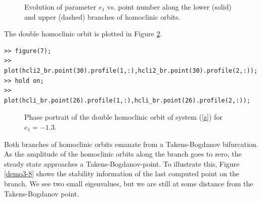 \documentclass[10pt]{article}
\begin{document}
{\begin{figure}[ht]
\begin{center}
\caption{\small\label{demo3-6}Evolution of parameter $e_1$ vs. point number
along the lower (solid) and upper (dashed) branches of homoclinic orbits.}
\end{center}
\end{figure}
 The double homoclinic orbit
is plotted in Figure \ref{demo3-7}.
{\small\begin{verbatim}
>> figure(7);
>> plot(hcli2_br.point(30).profile(1,:),hcli2_br.point(30).profile(2,:));
>> hold on;
>> plot(hcli_br.point(26).profile(1,:),hcli_br.point(26).profile(2,:));
\end{verbatim}}
\begin{figure}[ht]
\begin{center}
\caption{\small\label{demo3-7}Phase portrait of the double homoclinic orbit of system
(\ref{z}) for 
$e_{1}=-1.3$.}
\end{center}
\end{figure}
Both branches of homoclinic orbits emanate from a Takens-Bogdanov bifurcation.
 As the amplitude of the homoclinic orbits along the branch goes to zero, the 
steady state approaches a Takens-Bogdanov-point. To illustrate this, Figure
\ref{demo3-8} shows the stability information of the last computed point 
on the branch. We see two small eigenvalues, but we are still at some distance
from the Takens-Bogdanov point.
\begin{figure}
\begin{center}

\end{center}
\end{figure}}
\end{document}
